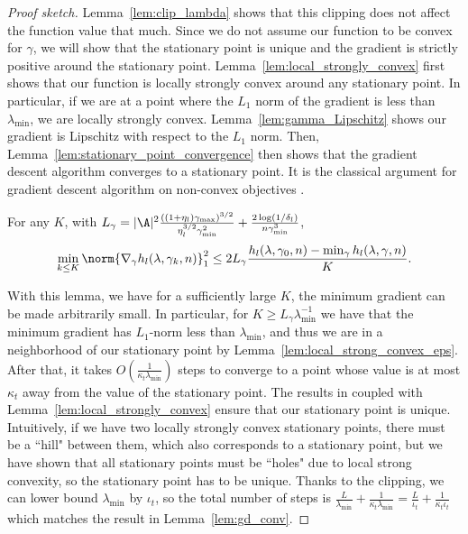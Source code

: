 \documentclass{article}
\newcommand{\1}{\mathbf{1}}
\begin{document}
\begin{proof}[Proof sketch]

Lemma~\ref{lem:clip_lambda} shows that this clipping does not affect the function value that much. Since we do not assume our function to be convex for $\gamma$, we will show that the stationary point is unique and the gradient is strictly positive around the stationary point. Lemma~\ref{lem:local_strongly_convex} first shows that our function is locally strongly convex around any stationary point. In particular, if we are at a point where the $L_1$ norm of the gradient is less than $\lambda_{\min}$, we are locally strongly convex. Lemma~\ref{lem:gamma_Lipschitz} shows our gradient is Lipschitz with respect to the $L_1$ norm. Then, Lemma~\ref{lem:stationary_point_convergence} then shows that the gradient descent algorithm converges to a stationary point. It is the classical argument for gradient descent algorithm on non-convex objectives \cite{jin2021nonconvex}.
\begin{lemma}\label{lem:stationary_point_convergence}
For any $K$, with $L_\gamma=|\A|^2\frac{((1+\eta_l)\gamma_{\max})^{3/2}}{\eta_l^{3/2}\gamma_{\min}^2}+\frac{2\log(1/\delta_l)}{n\gamma_{\min}^3}$, 
\[\min_{k\leq K}\norm{\nabla_{\gamma} h_l(\lambda,\gamma_k,n)}_1^2\leq 2L_\gamma\frac{h_l(\lambda,\gamma_0,n)-\min_{\gamma}h_l(\lambda,\gamma,n)}{K}.\]
\end{lemma}

With this lemma, we have for a sufficiently large $K$, the minimum gradient can be made arbitrarily small. In particular, for $K\geq L_\gamma\lambda_{\min}^{-1}$ we have that the minimum gradient has $L_1$-norm less than $\lambda_{\min}$, and thus we are in a neighborhood of our stationary point by Lemma~\ref{lem:local_strong_convex_eps}. After that, it takes $O(\frac{1}{\kappa_t\lambda_{\min}})$ steps to converge to a point whose value is at most $\kappa_t$ away from the value of the stationary point. The results in \cite{milnor1997topology} coupled with Lemma~\ref{lem:local_strongly_convex} ensure that our stationary point is unique. Intuitively, if we have two locally strongly convex stationary points, there must be a ``hill" between them, which also corresponds to a stationary point, but we have shown that all stationary points must be ``holes" due to local strong convexity, so the stationary point has to be unique.  Thanks to the clipping, we can lower bound $\lambda_{\min}$ by $\iota_t$, so the total number of steps is $\frac{L}{\lambda_{\min}}+\frac{1}{\kappa_t\lambda_{\min}}=\frac{L}{\iota_t}+\frac{1}{\kappa_t\iota_t}$ which matches the result in Lemma~\ref{lem:gd_conv}. 

\end{proof}
\end{document}
